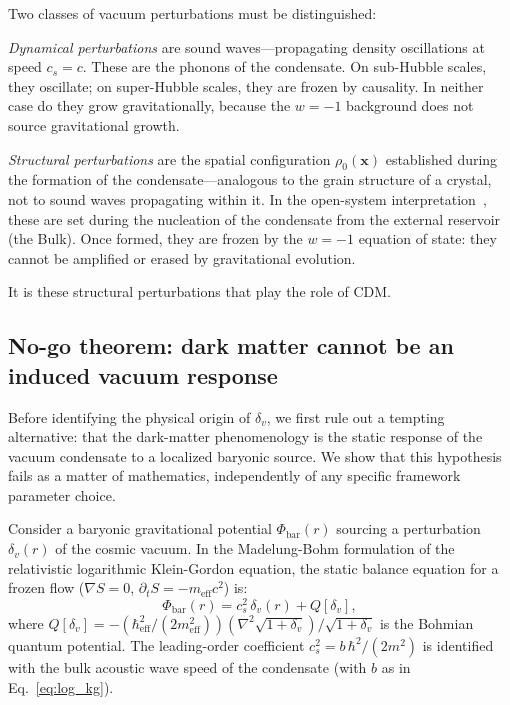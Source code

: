 \documentclass[12pt, a4paper]{article}
\begin{document}
Two classes of vacuum perturbations must be distinguished:

\emph{Dynamical perturbations} are sound waves---propagating density oscillations at speed $c_s = c$. These are the phonons of the condensate. On sub-Hubble scales, they oscillate; on super-Hubble scales, they are frozen by causality. In neither case do they grow gravitationally, because the $w = -1$ background does not source gravitational growth.

\emph{Structural perturbations} are the spatial configuration $\rho_0(\mathbf{x})$ established during the formation of the condensate---analogous to the grain structure of a crystal, not to sound waves propagating within it. In the open-system interpretation~\cite{kulangiev_2026c_cosmo}, these are set during the nucleation of the condensate from the external reservoir (the Bulk). Once formed, they are frozen by the $w = -1$ equation of state: they cannot be amplified or erased by gravitational evolution.

It is these structural perturbations that play the role of CDM.


\subsection{No-go theorem: dark matter cannot be an induced vacuum response}
\label{sec:no_go}

Before identifying the physical origin of $\delta_v$, we first rule out a tempting alternative: that the dark-matter phenomenology is the static response of the vacuum condensate to a localized baryonic source. We show that this hypothesis fails as a matter of mathematics, independently of any specific framework parameter choice.

Consider a baryonic gravitational potential $\Phi_\mathrm{bar}(r)$ sourcing a perturbation $\delta_v(r)$ of the cosmic vacuum. In the Madelung-Bohm formulation of the relativistic logarithmic Klein-Gordon equation, the static balance equation for a frozen flow ($\nabla S = 0$, $\partial_t S = -m_\mathrm{eff} c^2$) is:
\begin{equation}
    \Phi_\mathrm{bar}(r) = c_s^2\,\delta_v(r) + Q[\delta_v],
\label{eq:madelung_balance}
\end{equation}
where $Q[\delta_v] = -(\hbar_\mathrm{eff}^2/(2 m_\mathrm{eff}^2)) (\nabla^2\sqrt{1+\delta_v})/\sqrt{1+\delta_v}$ is the Bohmian quantum potential. The leading-order coefficient $c_s^2 = b\,\hbar^2/(2m^2)$ is identified with the bulk acoustic wave speed of the condensate (with $b$ as in Eq.~\ref{eq:log_kg}).
\end{document}
